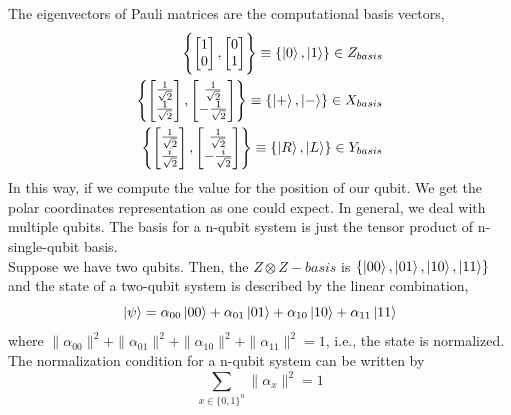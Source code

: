 The eigenvectors of Pauli matrices are the computational basis vectors,
\begin{align*}
    \Biggl\{\begin{bmatrix}
           1 \\
           0 
         \end{bmatrix}, \begin{bmatrix}
           0 \\
           1 
         \end{bmatrix} \Biggr\}\equiv \{\ket{0}, \ket{1}\} \in Z_{basis} \\
         \Biggl\{\begin{bmatrix}
           \frac{1}{\sqrt{2}} \\
           \frac{1}{\sqrt{2}} 
         \end{bmatrix}, \begin{bmatrix}
           \frac{1}{\sqrt{2}} \\
           -\frac{1}{\sqrt{2}} 
         \end{bmatrix} \Biggr\}\equiv \{\ket{+}, \ket{-}\} \in X_{basis} \\
         \Biggl\{\begin{bmatrix}
           \frac{1}{\sqrt{2}} \\
           \frac{i}{\sqrt{2}} 
         \end{bmatrix}, \begin{bmatrix}
           \frac{1}{\sqrt{2}} \\
           -\frac{i}{\sqrt{2}} 
         \end{bmatrix} \Biggr\}\equiv \{\ket{R}, \ket{L}\} \in Y_{basis}
\end{align*}
In this way, if we compute the value for the position of our qubit. We get the polar coordinates representation as one could expect.
In general, we deal with multiple qubits. The basis for a n-qubit system is just the tensor product of n-single-qubit basis.\\
Suppose we have two qubits. Then, the $Z\otimes Z-basis$ is $\{\ket{00},\ket{01},\ket{10},\ket{11}\}$ and the state of a two-qubit system is described by the linear combination,
\begin{equation}
    \ket{\psi} = \alpha_{00}\ket{00} +\alpha_{01}\ket{01} +\alpha_{10}\ket{10} +\alpha_{11}\ket{11}
\end{equation}
where $\|\alpha_{00}\|^{2} + \|\alpha_{01}\|^{2} + \|\alpha_{10}\|^{2} + \|\alpha_{11}\|^{2} = 1$, i.e., the state is normalized.\\
The normalization condition for a n-qubit system can be written by
\begin{equation}
\boxed{\sum_{x\in \{0,1\}^{n}}\|\alpha_{x}\|^{2} = 1}
\end{equation}
